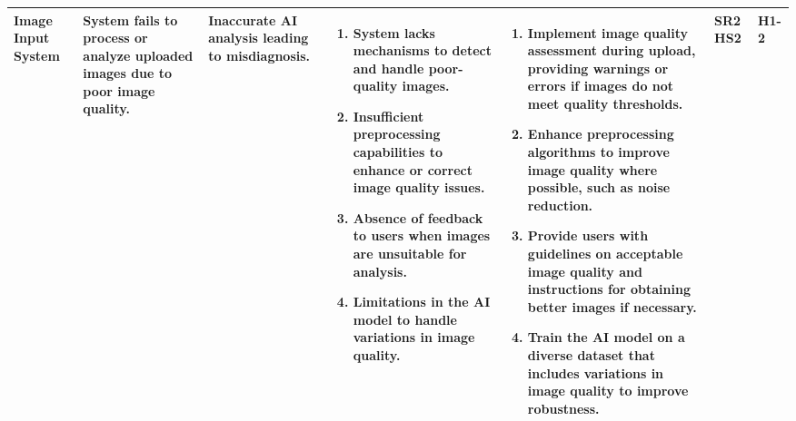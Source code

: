 \documentclass{article}
\begin{document}
\begin{landscape}
\begin{table}[ht]
{\begin{tabular}{|p{2.5cm}|p{2.5cm}|p{3cm}|p{5cm}|p{6cm}|p{1cm}|p{1cm}|}
    Image Input System
     & System fails to process or analyze uploaded images due to poor image quality.
     & Inaccurate AI analysis leading to misdiagnosis.
     &
     \begin{enumerate}[leftmargin=*, label={\alph*.}, itemsep=1pt]
         \item System lacks mechanisms to detect and handle poor-quality images.
         \item Insufficient preprocessing capabilities to enhance or correct image quality issues.
         \item Absence of feedback to users when images are unsuitable for analysis.
         \item Limitations in the AI model to handle variations in image quality.
     \end{enumerate}
     &
     \begin{enumerate}[leftmargin=*, label={\alph*.}, itemsep=1pt]
         \item Implement image quality assessment during upload, providing warnings or errors if images do not meet quality thresholds.
         \item Enhance preprocessing algorithms to improve image quality where possible, such as noise reduction.
         \item Provide users with guidelines on acceptable image quality and instructions for obtaining better images if necessary.
         \item Train the AI model on a diverse dataset that includes variations in image quality to improve robustness.
     \end{enumerate}
     & SR2 \newline HS2 & H1-2 \\ \hline

    \end{tabular}
    }
    \end{table}
\end{landscape}
\end{document}
